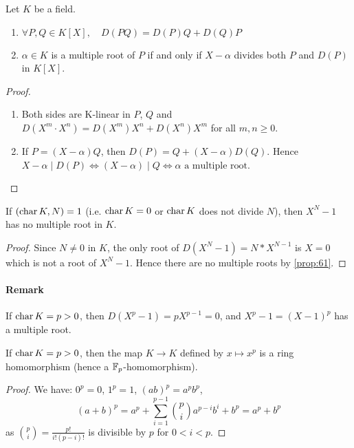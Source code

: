 \begin{proposition}
  \label{prop:61}
  Let $K$ be a field.
  \begin{enumerate}
  \item $\forall P, Q \in K[X], \quad D(PQ) = D(P)Q + D(Q)P$
  \item $\alpha \in K$ is a multiple root of $P$ if and only if $X-\alpha$ divides both $P$ and $D(P)$ in $K[X]$.
  \end{enumerate}
\end{proposition}

\begin{proof}
  \begin{enumerate}
  \item Both sides are K-linear in $P$, $Q$ and $D(X^m\cdot{}X^n) = D(X^m)X^n + D(X^n)X^m$ for all $m, n \geq 0$.
  \item If $P = (X-\alpha)Q$, then $D(P) = Q + (X-\alpha)D(Q)$. Hence $X-\alpha \mid D(P) \Leftrightarrow (X-\alpha) \mid Q \Leftrightarrow \alpha \text{ a multiple root}$.
  \end{enumerate}
\end{proof}

\begin{corollary}
  \label{cor:62}
  If $(\operatorname{char} K, N) = 1$ (i.e. $\operatorname{char} K = 0$ or $\operatorname{char} K$ does not divide $N$), then $X^N -1$ has no multiple root in $K$.
\end{corollary}

\begin{proof}
  Since $N \neq 0$ in $K$, the only root of $D(X^N-1) = N*X^{N-1}$ is $X = 0$ which is not a root of $X^N -1$. Hence there are no multiple roots by \autoref{prop:61}.
\end{proof}

\paragraph{Remark}

If $\operatorname{char} K = p > 0$, then $D(X^p-1) = pX^{p-1} = 0$, and $X^p-1 = (X-1)^p$ has a multiple root.

\begin{lemma}
  \label{lemma:63}
  If $\operatorname{char} K  = p > 0$, then the map $K \rightarrow K$ defined by $x \mapsto x^p$ is a ring homomorphism (hence a $\mathbb{F}_{p}$-homomorphism).
\end{lemma}

\begin{proof}
  We have: $0^p = 0$, $1^p = 1$, $(ab)^p = a^pb^p$,
\[
(a+b)^p = a^p + \sum_{i=1}^{p-1}\binom{p}{i}a^{p-i}b^i + b^p = a^p + b^p
\]
as $\binom{p}{i} = \frac{p!}{i!(p-i)!}$ is divisible by $p$ for $0 < i < p$.
\end{proof}

